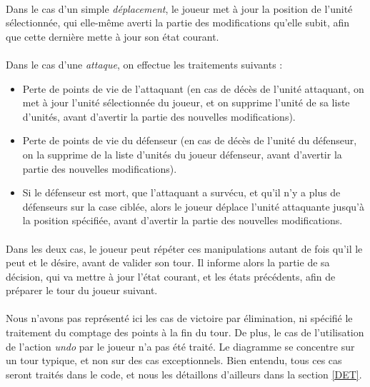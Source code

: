 \documentclass[a4paper]{article}
\begin{document}
\paragraph{}
Dans le cas d'un simple \textit{déplacement}, le joueur met à jour la position de l'unité sélectionnée, qui elle-même averti la partie des modifications qu'elle subit, afin que cette dernière mette à jour son état courant.

\paragraph{}
Dans le cas d'une \textit{attaque}, on effectue les traitements suivants :
\begin{itemize}
    \item Perte de points de vie de l'attaquant (en cas de décès de l'unité attaquant, on met à jour l'unité sélectionnée du joueur, et on supprime l'unité de sa liste d'unités, avant d'avertir la partie des nouvelles modifications).
    \item Perte de points de vie du défenseur (en cas de décès de l'unité du défenseur, on la supprime de la liste d'unités du joueur défenseur, avant d'avertir la partie des nouvelles modifications).
    \item Si le défenseur est mort, que l'attaquant a survécu, et qu'il n'y a plus de défenseurs sur la case ciblée, alors le joueur déplace l'unité attaquante jusqu'à la position spécifiée, avant d'avertir la partie des nouvelles modifications.
\end{itemize}

\paragraph{}
Dans les deux cas, le joueur peut répéter ces manipulations autant de fois qu'il le peut et le désire, avant de valider son tour. Il informe alors la partie de sa décision, qui va mettre à jour l'état courant, et les états précédents, afin de préparer le tour du joueur suivant.

\paragraph{}
Nous n'avons pas représenté ici les cas de victoire par élimination, ni spécifié le traitement du comptage des points à la fin du tour. De plus, le cas de l'utilisation de l'action \textit{undo} par le joueur n'a pas été traité. Le diagramme se concentre sur un tour typique, et non sur des cas exceptionnels. Bien entendu, tous ces cas seront traités dans le code, et nous les détaillons d'ailleurs dans la section \ref{DET}.
\end{document}
